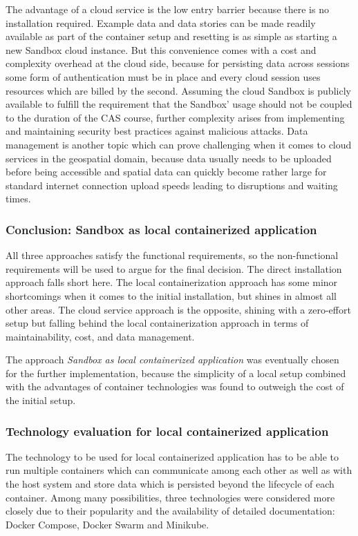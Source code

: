 \documentclass[11pt, a4paper, oneside, parskip=full-]{scrartcl}
\begin{document}
The advantage of a cloud service is the low entry barrier because there is no
installation required. Example data and data stories can be made readily
available as part of the container setup and resetting is as simple as starting
a new Sandbox cloud instance. But this convenience comes with a cost and
complexity overhead at the cloud side, because for persisting data across
sessions some form of authentication must be in place and every cloud session
uses resources which are billed by the second. Assuming the cloud Sandbox is
publicly available to fulfill the requirement that the Sandbox' usage should not
be coupled to the duration of the CAS course, further complexity arises from
implementing and maintaining security best practices against malicious attacks.
Data management is another topic which can prove challenging when it comes to
cloud services in the geospatial domain, because data usually needs to be
uploaded before being accessible and spatial data can quickly become rather
large for standard internet connection upload speeds leading to disruptions and
waiting times.

\subsubsection*{Conclusion: Sandbox as local containerized application}
All three approaches satisfy the functional requirements, so the non-functional
requirements will be used to argue for the final decision. The direct
installation approach falls short here. The local containerization approach has
some minor shortcomings when it comes to the initial installation, but shines in
almost all other areas. The cloud service approach is the opposite, shining with
a zero-effort setup but falling behind the local containerization approach in
terms of maintainability, cost, and data management.

The approach \emph{Sandbox as local containerized application} was eventually
chosen for the further implementation, because the simplicity of a local setup
combined with the advantages of container technologies was found to outweigh the
cost of the initial setup.

\subsubsection{Technology evaluation for local containerized application}
The technology to be used for local containerized application has to be able to
run multiple containers which can communicate among each other as well as with
the host system and store data which is persisted beyond the lifecycle of each
container. Among many possibilities, three technologies were considered more
closely due to their popularity and the availability of detailed documentation:
Docker Compose, Docker Swarm and Minikube.
\end{document}

